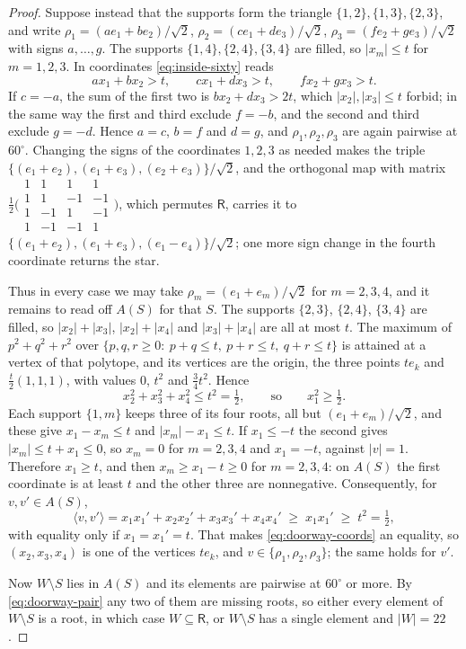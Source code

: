 \documentclass[11pt,reqno]{amsart}
\renewcommand{\_}{\origunderscore\allowbreak}
\numberwithin{equation}{section}
\theoremstyle{plain}
\theoremstyle{definition}
\theoremstyle{remark}
\newcommand{\Rt}{\mathsf{R}}                 %
\begin{document}
\begin{proof}
Suppose instead that the supports form the triangle
$\{1,2\},\{1,3\},\{2,3\}$, and write
$\rho_1=(ae_1+be_2)/\sqrt2$, $\rho_2=(ce_1+de_3)/\sqrt2$,
$\rho_3=(fe_2+ge_3)/\sqrt2$ with signs $a,\dots,g$. The supports
$\{1,4\},\{2,4\},\{3,4\}$ are filled, so $|x_m|\le t$ for $m=1,2,3$.
In coordinates \eqref{eq:inside-sixty} reads
\[
  ax_1+bx_2>t,\qquad cx_1+dx_3>t,\qquad fx_2+gx_3>t .
\]
If $c=-a$, the sum of the first two is $bx_2+dx_3>2t$, which
$|x_2|,|x_3|\le t$ forbid; in the same way the first and third exclude
$f=-b$, and the second and third exclude $g=-d$. Hence $a=c$, $b=f$ and
$d=g$, and $\rho_1,\rho_2,\rho_3$ are again pairwise at $60^\circ$. Changing the
signs of the coordinates $1,2,3$ as needed makes the triple
$\{(e_1+e_2),(e_1+e_3),(e_2+e_3)\}/\sqrt2$, and the orthogonal map with
matrix $\tfrac12\bigl(\begin{smallmatrix}1&1&1&1\\1&1&-1&-1\\
1&-1&1&-1\\1&-1&-1&1\end{smallmatrix}\bigr)$, which permutes $\Rt$,
carries it to $\{(e_1+e_2),(e_1+e_3),(e_1-e_4)\}/\sqrt2$; one more sign
change in the fourth coordinate returns the star.

Thus in every case we may take $\rho_m=(e_1+e_m)/\sqrt2$ for $m=2,3,4$, and
it remains to read off $A(S)$ for that $S$. The supports $\{2,3\}$,
$\{2,4\}$, $\{3,4\}$ are filled, so $|x_2|+|x_3|$, $|x_2|+|x_4|$ and
$|x_3|+|x_4|$ are all at most $t$. The maximum of $p^2+q^2+r^2$ over
$\{p,q,r\ge0:\ p+q\le t,\ p+r\le t,\ q+r\le t\}$ is attained at a vertex
of that polytope, and its vertices are the origin, the three points
$te_k$ and $\tfrac t2(1,1,1)$, with values $0$, $t^2$ and $\tfrac34t^2$.
Hence
\begin{equation}\label{eq:doorway-coords}
  x_2^2+x_3^2+x_4^2\le t^2=\tfrac12,
  \qquad\text{so}\qquad
  x_1^2\ge\tfrac12 .
\end{equation}
Each support $\{1,m\}$ keeps three of its four roots, all but
$(e_1+e_m)/\sqrt2$, and these give $x_1-x_m\le t$ and $|x_m|-x_1\le t$.
If $x_1\le-t$ the second gives $|x_m|\le t+x_1\le0$, so $x_m=0$ for
$m=2,3,4$ and $x_1=-t$, against $|v|=1$. Therefore $x_1\ge t$, and then
$x_m\ge x_1-t\ge0$ for $m=2,3,4$: on $A(S)$ the first coordinate is at
least $t$ and the other three are nonnegative. Consequently, for
$v,v'\in A(S)$,
\begin{equation}\label{eq:doorway-pair}
  \langle v,v'\rangle=x_1x_1'+x_2x_2'+x_3x_3'+x_4x_4'
  \;\ge\;x_1x_1'\;\ge\;t^2=\tfrac12 ,
\end{equation}
with equality only if $x_1=x_1'=t$. That makes
\eqref{eq:doorway-coords} an equality, so $(x_2,x_3,x_4)$ is one of the
vertices $te_k$, and $v\in\{\rho_1,\rho_2,\rho_3\}$; the same holds for
$v'$.

Now $W\setminus S$ lies in $A(S)$ and its elements are pairwise at
$60^\circ$ or more. By \eqref{eq:doorway-pair} any two of them are
missing roots, so either every element of $W\setminus S$ is a root, in
which case $W\subseteq\Rt$, or $W\setminus S$ has a single element and
$|W|=22$.
\end{proof}
\end{document}
